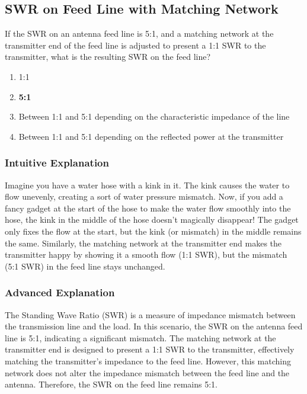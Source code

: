 \subsection{SWR on Feed Line with Matching Network}
\label{G9A08}

\begin{tcolorbox}[colback=gray!10!white,colframe=black!75!black,title=G9A08]
If the SWR on an antenna feed line is 5:1, and a matching network at the transmitter end of the feed line is adjusted to present a 1:1 SWR to the transmitter, what is the resulting SWR on the feed line?
\begin{enumerate}[label=\Alph*,noitemsep]
    \item 1:1
    \item \textbf{5:1}
    \item Between 1:1 and 5:1 depending on the characteristic impedance of the line
    \item Between 1:1 and 5:1 depending on the reflected power at the transmitter
\end{enumerate}
\end{tcolorbox}

\subsubsection{Intuitive Explanation}
Imagine you have a water hose with a kink in it. The kink causes the water to flow unevenly, creating a sort of water pressure mismatch. Now, if you add a fancy gadget at the start of the hose to make the water flow smoothly into the hose, the kink in the middle of the hose doesn't magically disappear! The gadget only fixes the flow at the start, but the kink (or mismatch) in the middle remains the same. Similarly, the matching network at the transmitter end makes the transmitter happy by showing it a smooth flow (1:1 SWR), but the mismatch (5:1 SWR) in the feed line stays unchanged.

\subsubsection{Advanced Explanation}
The Standing Wave Ratio (SWR) is a measure of impedance mismatch between the transmission line and the load. In this scenario, the SWR on the antenna feed line is 5:1, indicating a significant mismatch. The matching network at the transmitter end is designed to present a 1:1 SWR to the transmitter, effectively matching the transmitter's impedance to the feed line. However, this matching network does not alter the impedance mismatch between the feed line and the antenna. Therefore, the SWR on the feed line remains 5:1.

